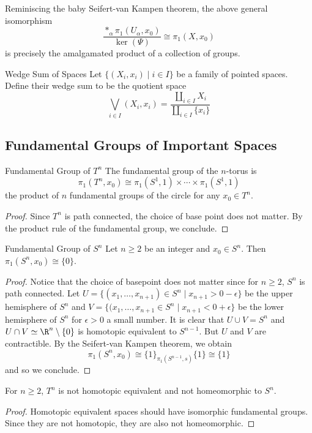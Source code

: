 \documentclass[a4paper]{article}
\begin{document}
Reminiscing the baby Seifert-van Kampen theorem, the above general isomorphism $$\frac{\ast_\alpha\pi_1(U_\alpha,x_0)}{\ker(\Psi)}\cong\pi_1(X,x_0)$$ is precisely the amalgamated product of a collection of groups. 

\begin{defn}{Wedge Sum of Spaces}{} Let $\{(X_i,x_i)\;|\;i\in I\}$ be a family of pointed spaces. Define their wedge sum to be the quotient space $$\bigvee_{i\in I}(X_i,x_i)=\frac{\coprod_{i\in I}X_i}{\coprod_{i\in I}\{x_i\}}$$
\end{defn}

\subsection{Fundamental Groups of Important Spaces}
\begin{thm}{Fundamental Group of $T^n$}{} The fundamental group of the $n$-torus is $$\pi_1(T^n,x_0)\cong\pi_1(S^1,1)\times\cdots\times\pi_1(S^1,1)$$ the product of $n$ fundamental groups of the circle for any $x_0\in T^n$. \tcbline
\begin{proof}
Since $T^n$ is path connected, the choice of base point does not matter. By the product rule of the fundamental group, we conclude. 
\end{proof}
\end{thm}

\begin{thm}{Fundamental Group of $S^n$}{} Let $n\geq 2$ be an integer and $x_0\in S^n$. Then $\pi_1(S^n,x_0)\cong\{0\}$. \tcbline
\begin{proof}
Notice that the choice of basepoint does not matter since for $n\geq 2$, $S^n$ is path connected. Let $U=\{(x_1,\dots,x_{n+1})\in S^n\;|\;x_{n+1}>0-\epsilon\}$ be the upper hemisphere of $S^n$ and $V=\{(x_1,\dots,x_{n+1}\in S^n\;|\; x_{n+1}<0+\epsilon\}$ be the lower hemisphere of $S^n$ for $\epsilon>0$ a small number. It is clear that $U\cup V=S^n$ and $U\cap V\simeq\R^n\setminus\{0\}$ is homotopic equivalent to $S^{n-1}$. But $U$ and $V$ are contractible. By the Seifert-van Kampen theorem, we obtain $$\pi_1(S^n,x_0)\cong\{1\}_{\pi_1(S^{n-1},s)}\{1\}\cong\{1\}$$ and so we conclude. 
\end{proof}
\end{thm}

\begin{crl}{}{} For $n\geq 2$, $T^n$ is not homotopic equivalent and not homeomorphic to $S^n$. \tcbline
\begin{proof}
Homotopic equivalent spaces should have isomorphic fundamental groups. Since they are not homotopic, they are also not homeomorphic. 
\end{proof}
\end{crl}
\end{document}
